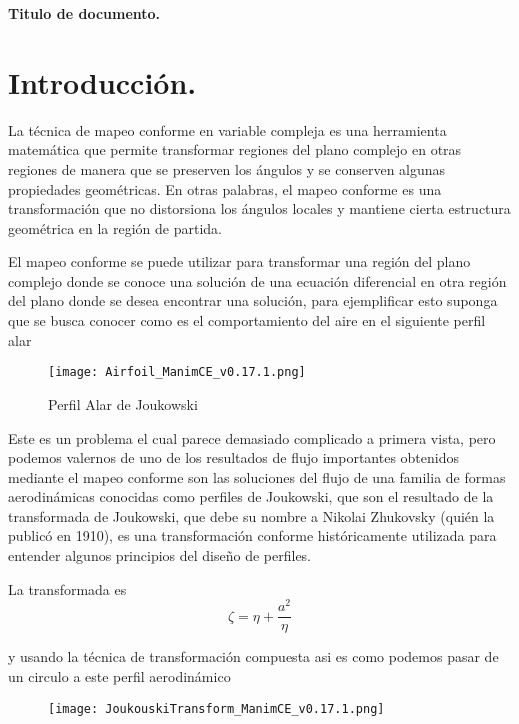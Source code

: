 \documentclass[12pt]{article}
\begin{document}
\newpage
\begin{center}
    \textbf{\Large Titulo de documento.}
    \end{center}

\section*{Introducción.}
	\noindent La técnica de mapeo conforme en variable compleja es una herramienta matemática que permite transformar regiones del plano complejo en otras regiones de manera que se preserven los ángulos y se conserven algunas propiedades geométricas. En otras palabras, el mapeo conforme es una transformación que no distorsiona los ángulos locales y mantiene cierta estructura geométrica en la región de partida.

	El mapeo conforme se puede utilizar para transformar una región del plano complejo donde se conoce una solución de una ecuación diferencial en otra región del plano donde se desea encontrar una solución, para ejemplificar esto suponga que se busca conocer como es el comportamiento del aire en el siguiente perfil alar

	\begin{figure}[!h]
		\begin{small}
			\begin{center}
				\texttt{[image: Airfoil\_ManimCE\_v0.17.1.png]}
			\end{center}
			\caption{Perfil Alar de Joukowski}
		\end{small}
	\end{figure}
	
	\noindent Este es un problema el cual parece demasiado complicado a primera vista, pero podemos valernos de uno de los resultados de flujo importantes obtenidos mediante el mapeo conforme son las soluciones del flujo de una familia de formas aerodinámicas conocidas como perfiles de Joukowski, que son el resultado de  la transformada de Joukowski, que debe su nombre a Nikolai Zhukovsky (quién la publicó en 1910), es una transformación conforme históricamente utilizada para entender algunos principios del diseño de perfiles.
	
	La transformada es
	\begin{equation}
		\zeta = \eta + \frac{a^2}{\eta}
		\label{eq:}
	\end{equation}
	
	\noindent y usando la técnica de transformación compuesta asi es como podemos pasar de un circulo a este perfil aerodinámico
	\begin{figure}[!h]
		\begin{small}
			\begin{center}
				\texttt{[image: JoukouskiTransform\_ManimCE\_v0.17.1.png]}
			\end{center}
			\caption{}
			\label{TransformacionCompuesta}
		\end{small}
	\end{figure}
	
\end{document}
